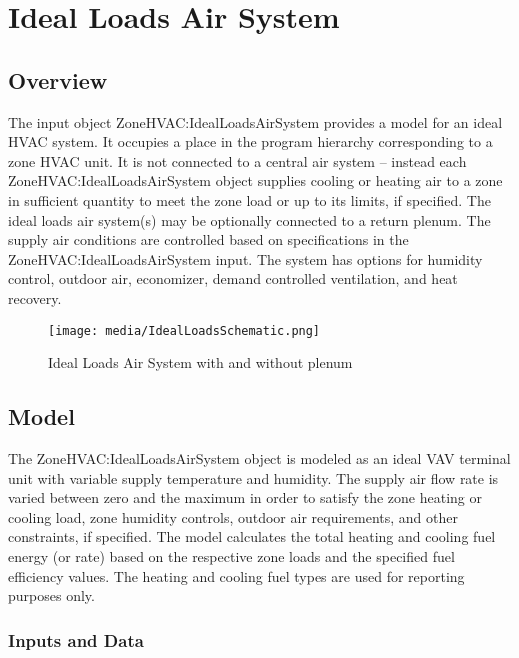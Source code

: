 \section{Ideal Loads Air System }\label{ideal-loads-air-system}

\subsection{Overview}\label{overview-021}

The input object ZoneHVAC:IdealLoadsAirSystem provides a model for an ideal HVAC system. It occupies a place in the program hierarchy corresponding to a zone HVAC unit. It is not connected to a central air system -- instead each ZoneHVAC:IdealLoadsAirSystem object supplies cooling or heating air to a zone in sufficient quantity to meet the zone load or up to its limits, if specified. The ideal loads air system(s) may be optionally connected to a return plenum. The supply air conditions are controlled based on specifications in the ZoneHVAC:IdealLoadsAirSystem input. The system has options for humidity control, outdoor air, economizer, demand controlled ventilation, and heat recovery.

\begin{figure}[hbtp] %
\centering
\texttt{[image: media/IdealLoadsSchematic.png]}
\caption{Ideal Loads Air System with and without plenum \protect \label{fig:ideal-loads-air-system-with-and-without-plenum}}
\end{figure}


\subsection{Model}\label{model-002}

The ZoneHVAC:IdealLoadsAirSystem object is modeled as an ideal VAV terminal unit with variable supply temperature and humidity. The supply air flow rate is varied between zero and the maximum in order to satisfy the zone heating or cooling load, zone humidity controls, outdoor air requirements, and other constraints, if specified. The model calculates the total heating and cooling fuel energy (or rate) based on the respective zone loads and the specified fuel efficiency values. The heating and cooling fuel types are used for reporting purposes only.

\subsubsection{Inputs and Data}\label{inputs-and-data-002}


